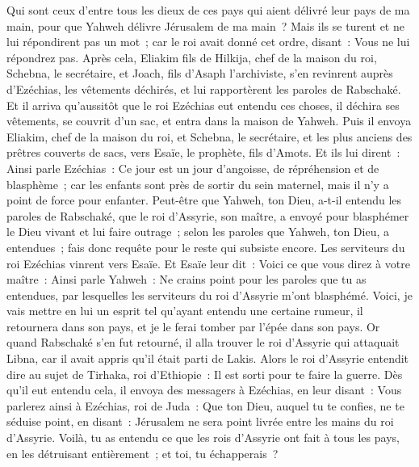 \begin{multicols}{2}
Qui sont ceux d'entre tous les dieux de ces pays qui aient délivré leur pays de ma main, pour que Yahweh délivre Jérusalem de ma main~?
Mais ils se turent et ne lui répondirent pas un mot~; car le roi avait donné cet ordre, disant~: Vous ne lui répondrez pas.
Après cela, Eliakim fils de Hilkija, chef de la maison du roi, Schebna, le secrétaire, et Joach, fils d'Asaph l'archiviste, s'en revinrent auprès d'Ezéchias, les vêtements déchirés, et lui rapportèrent les paroles de Rabschaké.
\VerseOne{}Et il arriva qu'aussitôt que le roi Ezéchias eut entendu ces choses, il déchira ses vêtements, se couvrit d'un sac, et entra dans la maison de Yahweh.
Puis il envoya Eliakim, chef de la maison du roi, et Schebna, le secrétaire, et les plus anciens des prêtres couverts de sacs, vers Esaïe, le prophète, fils d'Amots.
Et ils lui dirent~: Ainsi parle Ezéchias~: Ce jour est un jour d'angoisse, de répréhension et de blasphème~; car les enfants sont près de sortir du sein maternel, mais il n'y a point de force pour enfanter.
Peut-être que Yahweh, ton Dieu, a-t-il entendu les paroles de Rabschaké, que le roi d'Assyrie, son maître, a envoyé pour blasphémer le Dieu vivant et lui faire outrage~; selon les paroles que Yahweh, ton Dieu, a entendues~; fais donc requête pour le reste qui subsiste encore.
Les serviteurs du roi Ezéchias vinrent vers Esaïe.
Et Esaïe leur dit~: Voici ce que vous direz à votre maître~: Ainsi parle Yahweh~: Ne crains point pour les paroles que tu as entendues, par lesquelles les serviteurs du roi d'Assyrie m'ont blasphémé.
Voici, je vais mettre en lui un esprit tel qu'ayant entendu une certaine rumeur, il retournera dans son pays, et je le ferai tomber par l'épée dans son pays.
Or quand Rabschaké s'en fut retourné, il alla trouver le roi d'Assyrie qui attaquait Libna, car il avait appris qu'il était parti de Lakis.
Alors le roi d'Assyrie entendit dire au sujet de Tirhaka, roi d'Ethiopie~: Il est sorti pour te faire la guerre. Dès qu'il eut entendu cela, il envoya des messagers à Ezéchias, en leur disant~:
Vous parlerez ainsi à Ezéchias, roi de Juda~: Que ton Dieu, auquel tu te confies, ne te séduise point, en disant~: Jérusalem ne sera point livrée entre les mains du roi d'Assyrie.
Voilà, tu as entendu ce que les rois d'Assyrie ont fait à tous les pays, en les détruisant entièrement~; et toi, tu échapperais~?

\end{multicols}
